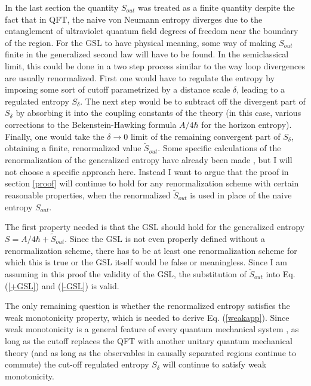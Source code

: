 \documentclass{article}
\begin{document}
In the last section the quantity $S_{out}$ was treated as a finite quantity despite the fact that in QFT, the naive von Neumann entropy diverges due to the entanglement of ultraviolet quantum field degrees of freedom near the boundary of the region.  For the GSL to have physical meaning, some way of making $S_{out}$ finite in the generalized second law will have to be found.  In the semiclassical limit, this could be done in a two step process similar to the way loop divergences are usually renormalized.  First one would have to regulate the entropy by imposing some sort of cutoff parametrized by a distance scale $\delta$, leading to a regulated entropy $S_\delta$.  The next step would be to subtract off the divergent part of $S_\delta$ by absorbing it into the coupling constants of the theory (in this case, various corrections to the Bekenstein-Hawking formula $A/{4\hbar}$ for the horizon entropy).  Finally, one would take the $\delta \to 0$ limit of the remaining convergent part of $S_\delta$, obtaining a finite, renormalized value $\tilde{S}_{out}$.  Some specific calculations of the renormalization of the generalized entropy have already been made \cite{FS94}, but I will not choose a specific approach here.  Instead I want to argue that the proof in section \ref{proof} will continue to hold for any renormalization scheme with certain reasonable properties, when the renormalized $\tilde{S}_{out}$ is used in place of the naive entropy $S_{out}$.

The first property needed is that the GSL should hold for the generalized entropy $S = A/{4\hbar} + \tilde{S}_{out}$.  Since the GSL is not even properly defined without a renormalization scheme, there has to be at least one renormalization scheme for which this is true or the GSL itself would be false or meaningless.  Since I am assuming in this proof the validity of the GSL, the substitution of $\tilde{S}_{out}$ into Eq. (\ref{+GSL}) and (\ref{-GSL}) is valid.

The only remaining question is whether the renormalized entropy satisfies the weak monotonicity property, which is needed to derive Eq. (\ref{weakapp}).  Since weak monotonicity is a general feature of every quantum mechanical system \cite{pipp03}, as long as the cutoff replaces the QFT with another unitary quantum mechanical theory (and as long as the observables in causally separated regions continue to commute) the cut-off regulated entropy $S_\delta$ will continue to satisfy weak monotonicity.
\end{document}
